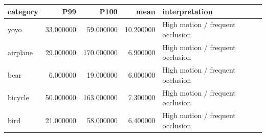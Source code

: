 \begin{tabular}{lrrrl}
\toprule
category & P99 & P100 & mean & interpretation \\
\midrule
yoyo & 33.000000 & 59.000000 & 10.200000 & High motion / frequent occlusion \\
airplane & 29.000000 & 170.000000 & 6.900000 & High motion / frequent occlusion \\
bear & 6.000000 & 19.000000 & 6.000000 & High motion / frequent occlusion \\
bicycle & 50.000000 & 163.000000 & 7.300000 & High motion / frequent occlusion \\
bird & 21.000000 & 58.000000 & 6.400000 & High motion / frequent occlusion \\
\bottomrule
\end{tabular}
